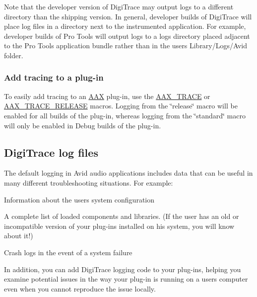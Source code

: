  Note that the developer version of Digi\+Trace may output logs to a different directory than the shipping version. In general, developer builds of Digi\+Trace will place log files in a directory next to the instrumented application. For example, developer builds of Pro Tools will output logs to a logs directory placed adjacent to the Pro Tools application bundle rather than in the user\textquotesingle{}s Library/\+Logs/\+Avid folder.

\hypertarget{a00364_digitrace__gettingstarted__addingtracing}{}\subsubsection{Add tracing to a plug-\/in}\label{a00364_digitrace__gettingstarted__addingtracing}
 To easily add tracing to an \hyperlink{a00288}{A\+A\+X} plug-\/in, use the \hyperlink{a00158_ab53f1d6a94f8b6ebb3a101f71bfe4e82}{A\+A\+X\+\_\+\+T\+R\+A\+C\+E} or \hyperlink{a00158_ac2aa820ece56bb59140ad561218db4b3}{A\+A\+X\+\_\+\+T\+R\+A\+C\+E\+\_\+\+R\+E\+L\+E\+A\+S\+E} macros. Logging from the \char`\"{}release\char`\"{} macro will be enabled for all builds of the plug-\/in, whereas logging from the \char`\"{}standard\char`\"{} macro will only be enabled in Debug builds of the plug-\/in.



 \hypertarget{a00364_digitrace__logfiles}{}\subsection{Digi\+Trace log files}\label{a00364_digitrace__logfiles}
 The default logging in Avid audio applications includes data that can be useful in many different troubleshooting situations. For example\+:


\begin{DoxyItemize}
\item Information about the user\textquotesingle{}s system configuration
\item A complete list of loaded components and libraries. (If the user has an old or incompatible version of your plug-\/ins installed on his system, you will know about it!)
\item Crash logs in the event of a system failure
\end{DoxyItemize}

 In addition, you can add Digi\+Trace logging code to your plug-\/ins, helping you examine potential issues in the way your plug-\/in is running on a user\textquotesingle{}s computer even when you cannot reproduce the issue locally.

